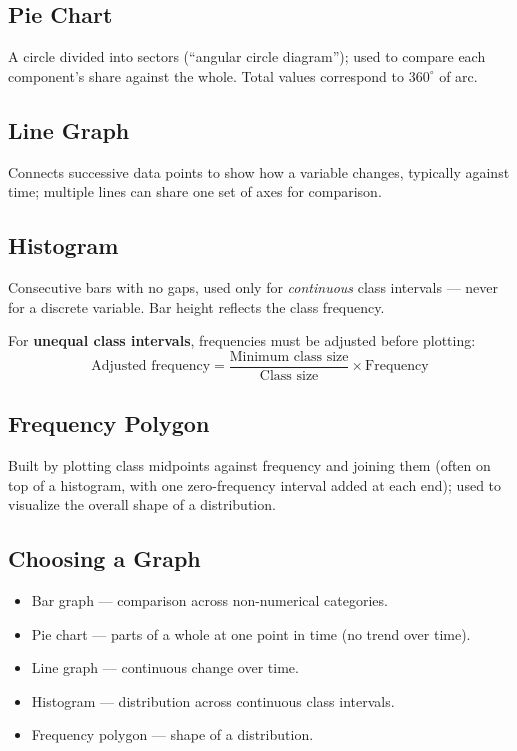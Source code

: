 \documentclass[11pt]{article}
\begin{document}
	\subsection{Pie Chart}
	A circle divided into sectors (``angular circle diagram''); used to compare each component's share against the whole. Total values correspond to $360^\circ$ of arc.
	
	\subsection{Line Graph}
	Connects successive data points to show how a variable changes, typically against time; multiple lines can share one set of axes for comparison.
	
	\subsection{Histogram}
	Consecutive bars with no gaps, used only for \emph{continuous} class intervals --- never for a discrete variable. Bar height reflects the class frequency.
	
	\begin{formulabox}
		For \textbf{unequal class intervals}, frequencies must be adjusted before plotting:
		\[
		\text{Adjusted frequency} = \frac{\text{Minimum class size}}{\text{Class size}} \times \text{Frequency}
		\]
	\end{formulabox}
	
	\subsection{Frequency Polygon}
	Built by plotting class midpoints against frequency and joining them (often on top of a histogram, with one zero-frequency interval added at each end); used to visualize the overall shape of a distribution.
	
	\subsection{Choosing a Graph}
	\begin{itemize}[leftmargin=*]
		\item Bar graph --- comparison across non-numerical categories.
		\item Pie chart --- parts of a whole at one point in time (no trend over time).
		\item Line graph --- continuous change over time.
		\item Histogram --- distribution across continuous class intervals.
		\item Frequency polygon --- shape of a distribution.
	\end{itemize}
	
\end{document}
